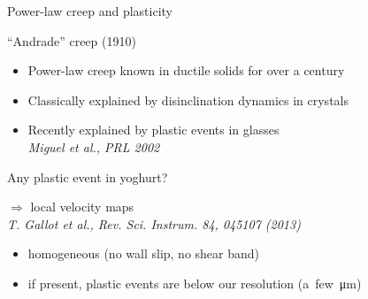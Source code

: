 \begin{frame}{Power-law creep and plasticity}
\begin{block}{``Andrade'' creep (1910)}
\begin{itemize}
\item Power-law creep known in \alert{ductile solids} for over a century
\item Classically explained by disinclination dynamics in crystals
\item Recently explained by plastic events in glasses\\\hfill \textit{\footnotesize Miguel et al., PRL 2002}
\end{itemize}
\end{block}

Any plastic event in yoghurt?

\bigskip
{} $\Rightarrow$ local velocity maps\\\hfill\textit{\footnotesize T. Gallot et al., Rev. Sci. Instrum. 84, 045107 (2013)}
\begin{itemize}
	\item homogeneous  (no wall slip, no shear band)
	\item if present, plastic events are below our resolution {\small (a~few~\si{\micro\metre})}
\end{itemize}
\end{frame}




